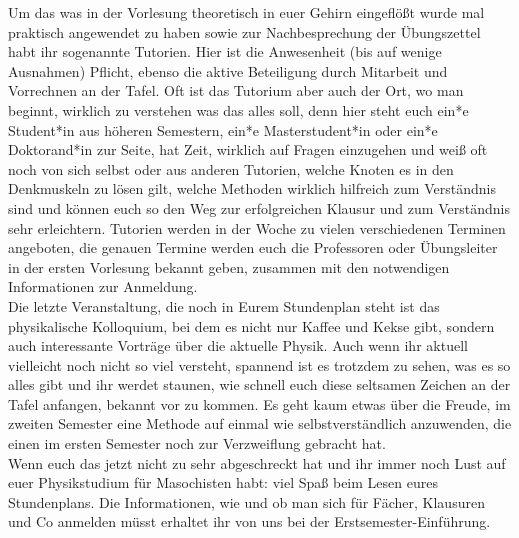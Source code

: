Um das was in der Vorlesung theoretisch in euer Gehirn eingeflößt wurde mal praktisch angewendet zu haben sowie zur Nachbesprechung der Übungszettel habt ihr sogenannte Tutorien. Hier ist die Anwesenheit (bis auf wenige Ausnahmen) Pflicht, ebenso die aktive Beteiligung durch Mitarbeit und Vorrechnen an der Tafel. Oft ist das Tutorium aber auch der Ort, wo man beginnt, wirklich zu verstehen was das alles soll, denn hier steht euch ein*e Student*in aus höheren Semestern, ein*e Masterstudent*in oder ein*e Doktorand*in zur Seite, hat Zeit, wirklich auf Fragen einzugehen und weiß oft noch von sich selbst oder aus anderen Tutorien, welche Knoten es in den Denkmuskeln zu lösen gilt, welche Methoden wirklich hilfreich zum Verständnis sind und können euch so den Weg zur erfolgreichen Klausur und zum Verständnis sehr erleichtern. Tutorien werden in der Woche zu vielen verschiedenen Terminen angeboten, die genauen Termine werden euch die Professoren oder Übungsleiter in der ersten Vorlesung bekannt geben, zusammen mit den notwendigen Informationen zur Anmeldung.\\
Die letzte Veranstaltung, die noch in Eurem Stundenplan steht ist das physikalische Kolloquium, bei dem es nicht nur Kaffee und Kekse gibt, sondern auch interessante Vorträge über die aktuelle Physik. Auch wenn ihr aktuell vielleicht noch nicht so viel versteht, spannend ist es trotzdem zu sehen, was es so alles gibt und ihr werdet staunen, wie schnell euch diese seltsamen Zeichen an der Tafel anfangen, bekannt vor zu kommen. Es geht kaum etwas über die Freude, im zweiten Semester eine Methode auf einmal wie selbstverständlich anzuwenden, die einen im ersten Semester noch zur Verzweiflung gebracht hat.\\
Wenn euch das jetzt nicht zu sehr abgeschreckt hat und ihr immer noch Lust auf euer Physikstudium für Masochisten habt: viel Spaß beim Lesen eures Stundenplans. Die Informationen, wie und ob man sich für Fächer, Klausuren und Co anmelden müsst erhaltet ihr von uns bei der Erstsemester-Einführung.

\noindent%
\

